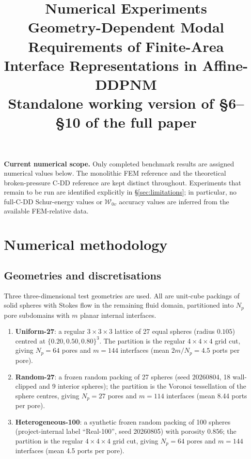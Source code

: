 \documentclass[11pt,a4paper]{article}
\newcommand{\Wspace}{\mathcal{W}}
\begin{document}
\title{\textbf{Numerical Experiments}\\[4pt]
       \large Geometry-Dependent Modal Requirements of Finite-Area
       Interface Representations in Affine-DDPNM\\[4pt]
       \normalsize Standalone working version of \S6--\S10 of the full paper}
\author{}
\date{}
\maketitle

\setcounter{section}{5}

\noindent\textbf{Current numerical scope.}
Only completed benchmark results are assigned numerical values below.
The monolithic FEM reference and the theoretical broken-pressure C-DD
reference are kept distinct throughout.  Experiments that remain to be
run are identified explicitly in \S\ref{sec:limitations}; in particular,
no full-C-DD Schur-energy values or $\Wspace_{0v}$ accuracy values are
inferred from the available FEM-relative data.

\section{Numerical methodology}
\label{sec:methodology}

\subsection{Geometries and discretisations}
\label{sec:geometries}

Three three-dimensional test geometries are used.  All are unit-cube
packings of solid spheres with Stokes flow in the remaining fluid domain,
partitioned into $N_p$ pore subdomains with $m$ planar internal
interfaces.

\begin{enumerate}[label=(\roman*),nosep,leftmargin=*]
\item \textbf{Uniform-27}: a regular $3\times3\times3$ lattice of 27
  equal spheres (radius $0.105$) centred at
  $\{0.20,0.50,0.80\}^3$.  The partition is the regular $4\times4\times4$
  grid cut, giving $N_p = 64$ pores and $m = 144$ interfaces
  (mean $2m/N_p = 4.5$ ports per pore).
\item \textbf{Random-27}: a frozen random packing of 27 spheres
  (seed 20260804, 18 wall-clipped and 9 interior spheres); the partition
  is the Voronoi tessellation of the sphere centres, giving $N_p = 27$
  pores and $m = 114$ interfaces (mean 8.44 ports per pore).
\item \textbf{Heterogeneous-100}: a synthetic frozen random packing of 100 spheres
  (project-internal label ``Real-100'', seed 20260805) with porosity $0.856$;
  the partition is the regular
  $4\times4\times4$ grid cut, giving $N_p = 64$ pores and $m = 144$
  interfaces (mean 4.5 ports per pore).
\end{enumerate}
\end{document}
